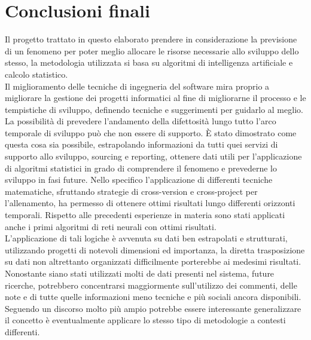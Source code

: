 \documentclass[%
    corpo=12pt,
    twoside,
    oldstyle,
    autoretitolo,
    greek,
    evenboxes,
]{toptesi}
\begin{document}
\section{Conclusioni finali}
Il progetto trattato in questo elaborato prendere in considerazione la previsione di un fenomeno per poter meglio allocare le risorse necessarie allo sviluppo dello stesso, la metodologia utilizzata si basa su algoritmi di intelligenza artificiale e calcolo statistico.\\
Il miglioramento delle tecniche di ingegneria del software mira proprio a migliorare la gestione dei progetti informatici al fine di migliorarne il processo e le tempistiche di sviluppo, definendo tecniche e suggerimenti per guidarlo al meglio. La possibilità di prevedere l'andamento della difettosità lungo tutto l'arco temporale di sviluppo può che non essere di supporto. È stato dimostrato come questa cosa sia possibile, estrapolando informazioni da tutti quei servizi di supporto allo sviluppo, sourcing e reporting, ottenere dati utili per l'applicazione di algoritmi statistici in grado di comprendere il fenomeno e prevederne lo sviluppo in fasi future. Nello specifico l'applicazione di differenti tecniche matematiche, sfruttando strategie di cross-version e cross-project \cite{Chen} per l'allenamento, ha permesso di ottenere ottimi risultati lungo differenti orizzonti temporali. Rispetto alle precedenti esperienze \cite{santosh_se}\cite{rathore} in materia sono stati applicati anche i primi algoritmi di reti neurali con ottimi risultati.\\
L'applicazione di tali logiche è avvenuta su dati ben estrapolati e strutturati, utilizzando progetti di notevoli dimensioni ed importanza, la diretta trasposizione su dati non altrettanto organizzati difficilmente porterebbe ai medesimi risultati. Nonostante siano stati utilizzati molti de dati presenti nel sistema, future ricerche, potrebbero concentrarsi maggiormente sull'utilizzo dei commenti, delle note e di tutte quelle informazioni meno tecniche e più sociali ancora disponibili. Seguendo un discorso molto più ampio potrebbe essere interessante generalizzare il concetto è eventualmente applicare lo stesso tipo di metodologie a contesti differenti.




\end{document}
